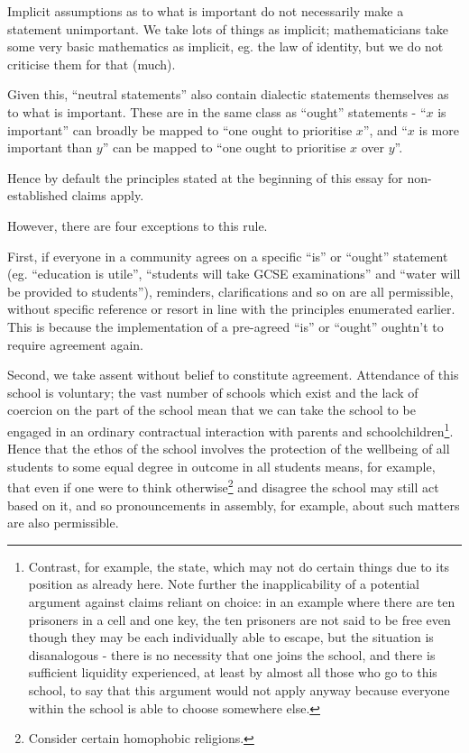 \documentclass[12pt,a4paper]{report}
\begin{document}
\begin{multicols}{2}
\begin{multicols}{2}
Implicit assumptions as to what is important do not necessarily make a
statement unimportant. We take lots of things as implicit;
mathematicians take some very basic mathematics as implicit, eg. the law
of identity, but we do not criticise them for that (much).

Given this, ``neutral statements'' also contain dialectic statements
themselves as to what is important. These are in the same class as
``ought'' statements - ``$x$ is important'' can broadly be mapped
to ``one ought to prioritise $x$'', and ``$x$ is more
important than $y$'' can be mapped to ``one ought to prioritise
$x$ over $y$''.

Hence by default the principles stated at the beginning of this essay
for non-established claims apply.

However, there are four exceptions to this rule.

First, if everyone in a community agrees on a specific ``is'' or
``ought'' statement (eg. ``education is utile'', ``students will take
GCSE examinations'' and ``water will be provided to students''),
reminders, clarifications and so on are all permissible, without
specific reference or resort in line with the principles enumerated
earlier. This is because the implementation of a pre-agreed ``is'' or
``ought'' oughtn't to require agreement again.

Second, we take assent without belief to constitute agreement.
Attendance of this school is voluntary; the vast number of schools which
exist and the lack of coercion on the part of the school mean that we
can take the school to be engaged in an ordinary contractual interaction
with parents and schoolchildren\footnote{Contrast, for example, the
	state, which may not do certain things due to its position as already
	here. Note further the inapplicability of a potential argument against
	claims reliant on choice: in an example where there are ten prisoners
	in a cell and one key, the ten prisoners are not said to be free even
	though they may be each individually able to escape, but the situation
	is disanalogous - there is no necessity that one joins the school, and
	there is sufficient liquidity experienced, at least by almost all
	those who go to this school, to say that this argument would not apply
	anyway because everyone within the school is able to choose somewhere
	else.}. Hence that the ethos of the school involves the protection of
the wellbeing of all students to some equal degree in outcome in all
students means, for example, that even if one were to think
otherwise\footnote{Consider certain homophobic religions.} and disagree
the school may still act based on it, and so pronouncements in assembly,
for example, about such matters are also permissible.


\end{multicols}
\end{multicols}
\end{document}
